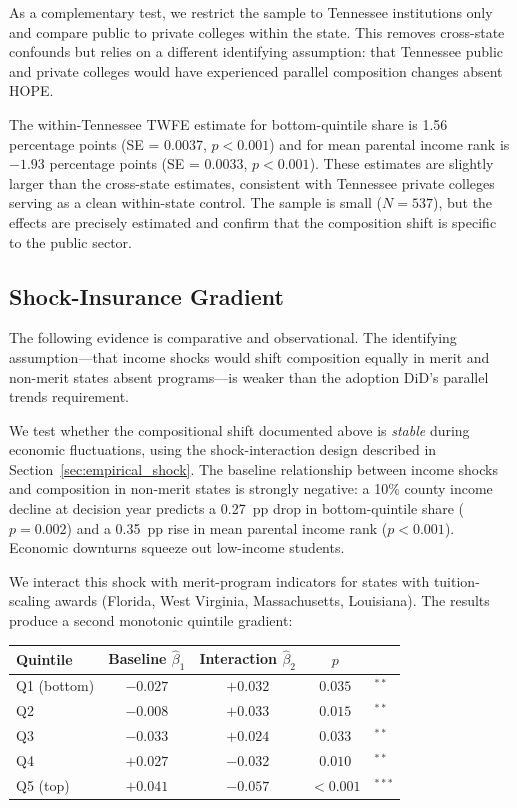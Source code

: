 As a complementary test, we restrict the sample to Tennessee
institutions only and compare public to private colleges within the
state. This removes cross-state confounds but relies on a different identifying assumption: that Tennessee public and private colleges would have experienced parallel composition changes absent HOPE.

The within-Tennessee TWFE estimate for bottom-quintile share is 1.56
percentage points (SE = 0.0037, $p < 0.001$) and for mean parental
income rank is $-1.93$ percentage points (SE = 0.0033, $p < 0.001$).
These estimates are slightly larger than the cross-state estimates,
consistent with Tennessee private colleges serving as a clean
within-state control. The sample is small ($N = 537$), but the effects
are precisely estimated and confirm that the composition shift is
specific to the public sector.

\subsection{Shock-Insurance Gradient}
\label{sec:results_insurance}

The following evidence is comparative and observational. The identifying
assumption---that income shocks would shift composition equally in merit
and non-merit states absent programs---is weaker than the adoption DiD's
parallel trends requirement.

We test whether the compositional shift documented above is
\emph{stable} during economic fluctuations, using the shock-interaction
design described in Section~\ref{sec:empirical_shock}. The baseline
relationship between income shocks and composition in non-merit states
is strongly negative: a 10\% county income decline at decision year
predicts a 0.27~pp drop in bottom-quintile share ($p = 0.002$) and a
0.35~pp rise in mean parental income rank ($p < 0.001$). Economic
downturns squeeze out low-income students.

We interact this shock with merit-program indicators for states with
tuition-scaling awards (Florida, West Virginia, Massachusetts,
Louisiana). The results produce a second monotonic quintile gradient:

\begin{center}
\begin{tabular}{lcccl}
\toprule
Quintile & Baseline $\hat\beta_1$ & Interaction $\hat\beta_2$ & $p$ & \\
\midrule
Q1 (bottom) & $-0.027$ & $+0.032$ & $0.035$ & $^{**}$ \\
Q2 & $-0.008$ & $+0.033$ & $0.015$ & $^{**}$ \\
Q3 & $-0.033$ & $+0.024$ & $0.033$ & $^{**}$ \\
Q4 & $+0.027$ & $-0.032$ & $0.010$ & $^{**}$ \\
Q5 (top) & $+0.041$ & $-0.057$ & $<0.001$ & $^{***}$ \\
\bottomrule
\end{tabular}
\end{center}

